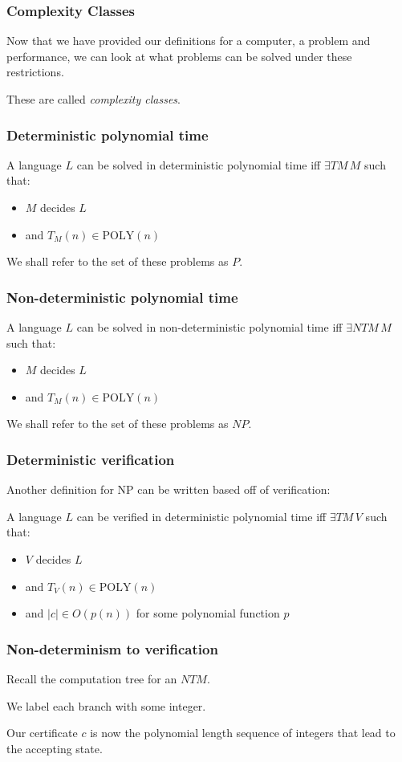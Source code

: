 \documentclass[aspectratio=169]{beamer}
\begin{document}
\begin{frame}
\frametitle{Complexity Classes}
Now that we have provided our definitions for a computer, a problem and performance, we can look at what problems can be solved under these restrictions.

These are called {\em complexity classes}.
\end{frame}

\begin{frame}
\frametitle{Deterministic polynomial time}
A language $L$ can be solved in deterministic polynomial time iff $\exists TM\, M$ such that:

\begin{itemize}
\item $M$ decides $L$
\item and $T_M(n) \in \mathrm{POLY}(n)$
\end{itemize}

We shall refer to the set of these problems as $P$.
\end{frame}

\begin{frame}
\frametitle{Non-deterministic polynomial time}
A language $L$ can be solved in non-deterministic polynomial time iff $\exists NTM\, M$ such that:

\begin{itemize}
\item $M$ decides $L$
\item and $T_M(n) \in \mathrm{POLY}(n)$
\end{itemize}

We shall refer to the set of these problems as $NP$.
\end{frame}

\begin{frame}
\frametitle{Deterministic verification}
Another definition for NP can be written based off of verification:

A language $L$ can be verified in deterministic polynomial time iff $\exists TM\, V$ such that:

\begin{itemize}
\item $V$ decides $L$
\item and $T_V(n) \in \mathrm{POLY}(n)$
\item and $|c| \in O(p(n))$ for some polynomial function $p$
\end{itemize}
\end{frame}

\begin{frame}
\frametitle{Non-determinism to verification}
Recall the computation tree for an $NTM$.

We label each branch with some integer.

Our certificate $c$ is now the polynomial length sequence of integers that lead to the accepting state.
\end{frame}
\end{document}
